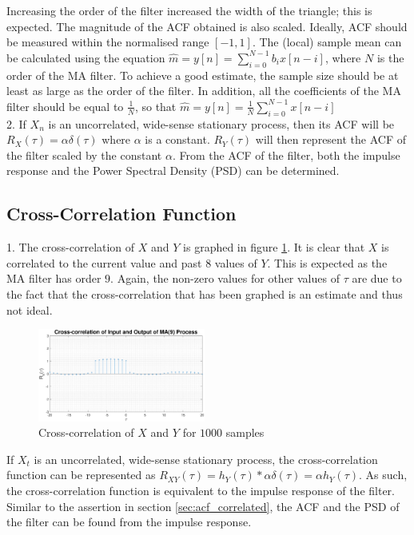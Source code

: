 \documentclass{article}
\begin{document}
Increasing the order of the filter increased the width of the triangle; this is expected. The magnitude of the ACF obtained is also scaled. Ideally, ACF should be measured within the normalised range $[-1, 1]$. The (local) sample mean can be calculated using the equation $\hat{m} = y[n] = \sum_{i=0}^{N-1}b_{i}x[n-i]$, where $N$ is the order of the MA filter. To achieve a good estimate, the sample size should be at least as large as the order of the filter. In addition, all the coefficients of the MA filter should be equal to $\frac{1}{N}$, so that $\hat{m} = y[n] = \frac{1}{N}\sum_{i=0}^{N-1}x[n-i]$\\

2. If $X_{n}$ is an uncorrelated, wide-sense stationary process, then its ACF will be $R_{X}(\tau) = \alpha\delta(\tau)$ where $\alpha$ is a constant. $R_{Y}(\tau)$ will then represent the ACF of the filter scaled by the constant $\alpha$. From the ACF of the filter, both the impulse response and the Power Spectral Density (PSD) can be determined.

\subsection{Cross-Correlation Function}

1. The cross-correlation of $X$ and $Y$ is graphed in figure \ref{fig:cross_correlated}. It is clear that $X$ is correlated to the current value and past $8$ values of $Y$. This is expected as the MA filter has order $9$. Again, the non-zero values for other values of $\tau$ are due to the fact that the cross-correlation that has been graphed is an estimate and thus not ideal.

\begin{figure}[H]
    \centering
    \includegraphics[width=0.49\textwidth]{cross_correlation}
    \caption{Cross-correlation of $X$ and $Y$ for $1000$ samples}
    \label{fig:cross_correlated}
\end{figure}

If $X_{t}$ is an uncorrelated, wide-sense stationary process, the cross-correlation function can be represented as $R_{XY}(\tau) = h_{Y} (\tau) \ast \alpha\delta(\tau) = \alpha h_{Y}(\tau)$. As such, the cross-correlation function is equivalent to the impulse response of the filter. Similar to the assertion in section \ref{sec:acf_correlated}, the ACF and the PSD of the filter can be found from the impulse response.\\
\end{document}

